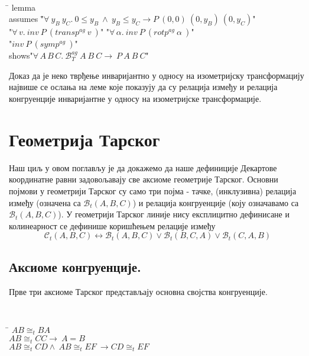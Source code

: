 \documentclass[a4paper, 12pt]{article}
\newcommand{\agbett}[3]{\ensuremath{\mathcal{B}_T^{\mathit{ag}}\ #1\ #2\ #3}}
\newcommand{\agtransp}[2]{\ensuremath{transp^{ag}\ #1\ #2}}
\newcommand{\agrotp}[2]{\ensuremath{rotp^{ag}\ #1\ #2}}
\newcommand{\agsymp}[1]{\ensuremath{symp^{ag}\ #1}}
\newcommand{\bett}[3]{\ensuremath{\mathcal{B}_t(#1, #2, #3)}}
\newcommand{\colint}[3]{\ensuremath{\mathcal{C}_t(#1, #2, #3)}}
\newcommand{\congrt}[4]{\ensuremath{#1#2 \cong_t #3#4}}
\begin{document}
{\tt
\begin{tabbing}
\hspace{5mm}\=\kill
lemma\\
\>assumes \="$\forall\ y_B\ y_C.\ 0 \le y_B \ \wedge\  y_B \le y_C \longrightarrow P\ (0, 0)\ (0, y_B)\ (0, y_C)$"\\
\>\>       "$\forall\,v.\ inv\ P\ (\agtransp{v}{})$" "$\forall\,\alpha.\ inv\ P\ (\agrotp{\alpha}{})$"\\
\>\>       "$inv\ P\ (\agsymp{})$"\\
\>shows\>"$\forall\,A\,B\,C.\ \agbett{A}{B}{C} \longrightarrow\ P\
A\ B\ C$"
\end{tabbing}
}

Доказ да је неко тврђење инваријантно у односу на изометријску
трансформацију највише се ослања на леме које показују да су релација
између и релација конгруенције инваријантне у односу на изометријске
трансформације.

\section{Геометрија Тарског}
\label{sec:tarski}

Наш циљ у овом поглављу је да докажемо да наше дефиниције Декартове
координатне равни задовољавају све аксиоме геометрије
Тарског\cite{tarski}.  Основни појмови у геометрији Тарског су само
три појма - тачке, (инклузивна) релација између (означена са
$\bett{A}{B}{C}$) и релација конгруенције (коју означавамо са
$\bett{A}{B}{C}$). У геометрији Тарског линије нису експлицитно
дефинисане и колинеарност се дефинише коришћењем релације између
$$\colint{A}{B}{C} \longleftrightarrow \bett{A}{B}{C} \vee \bett{B}{C}{A} \vee \bett{C}{A}{B}$$

\subsection{Аксиоме конгруенције.}

Прве три аксиоме Тарског представљају основна својства конгруенције.
{\tt
\begin{tabbing}
\hspace{5mm}\=\kill
$\congrt{A}{B}{B}{A}$\\
$\congrt{A}{B}{C}{C} \longrightarrow\ A = B$\\
$\congrt{A}{B}{C}{D} \wedge\ \congrt{A}{B}{E}{F}\ \longrightarrow \congrt{C}{D}{E}{F}$
\end{tabbing}
}
\vspace{-2mm}
\end{document}
